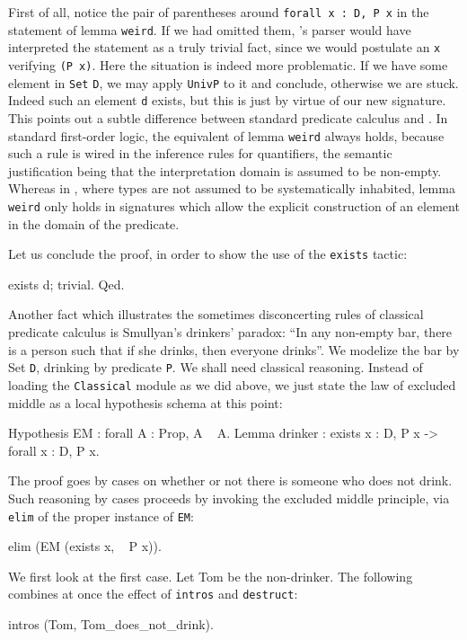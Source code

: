 \documentclass[11pt,a4paper]{book}
\begin{document}
First of all, notice the pair of parentheses around
\verb+forall x : D, P x+ in
the statement of lemma \verb:weird:.
If we had omitted them, \Coq's parser would have interpreted the
statement as a truly trivial fact, since we would 
postulate an \verb:x: verifying \verb:(P x):. Here the situation is indeed
more problematic. If we have some element in \verb:Set: \verb:D:, we may
apply \verb:UnivP: to it and conclude, otherwise we are stuck. Indeed
such an element \verb:d: exists, but this is just by virtue of our
new signature. This points out a subtle difference between standard
predicate calculus and \Coq. In standard first-order logic,
the equivalent of lemma \verb:weird: always holds, 
because such a rule is wired in the inference rules for quantifiers, the
semantic justification being that the interpretation domain is assumed to
be non-empty. Whereas in \Coq, where types are not assumed to be 
systematically inhabited, lemma \verb:weird: only holds in signatures
which allow the explicit construction of an element in the domain of
the predicate. 

Let us conclude the proof, in order to show the use of the \verb:exists:
tactic:
\begin{coq_example}
exists d; trivial.
Qed.
\end{coq_example}

Another fact which illustrates the sometimes disconcerting rules of
classical 
predicate calculus is Smullyan's drinkers' paradox: ``In any non-empty
bar, there is a person such that if she drinks, then everyone drinks''.
We modelize the bar by Set \verb:D:, drinking by predicate \verb:P:.
We shall need classical reasoning. Instead of loading the \verb:Classical:
module as we did above, we just state the law of excluded middle as a
local hypothesis schema at this point:
\begin{coq_example}
Hypothesis EM : forall A : Prop, A \/ ~ A.
Lemma drinker :  exists x : D, P x -> forall x : D, P x.
\end{coq_example}
The proof goes by cases on whether or not
there is someone who does not drink. Such reasoning by cases proceeds
by invoking the excluded middle principle, via \verb:elim: of the
proper instance of \verb:EM::
\begin{coq_example}
elim (EM (exists x, ~ P x)).
\end{coq_example}

We first look at the first case. Let Tom be the non-drinker.
The following combines at once the effect of \verb:intros: and
\verb:destruct::
\begin{coq_example}
intros (Tom, Tom_does_not_drink).
\end{coq_example}
\end{document}
